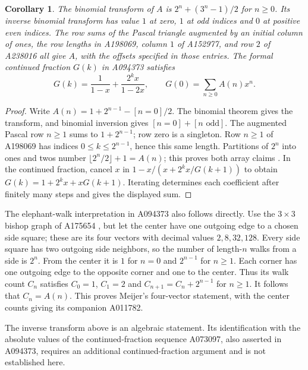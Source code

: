 \documentclass[11pt]{article}
\newtheorem{corollary}[theorem]{Corollary}
\begin{document}
\begin{corollary}\label{encodings}
The binomial transform of $A$ is $2^n+(3^n-1)/2$ for $n\ge0$.
Its inverse binomial transform has value $1$ at zero, $1$ at odd
indices and $0$ at positive even indices. The row sums of the
Pascal triangle augmented by an initial column of ones, the row
lengths in A198069, column $1$ of A152977, and row $2$ of A238016
all give $A$, with the offsets specified in those entries.
The formal continued fraction $G(k)$ in A094373 satisfies
\[
 G(k)=\frac{1}{1-x}+\frac{2^k x}{1-2x},\qquad G(0)=\sum_{n\ge0}A(n)x^n.
\]
\end{corollary}
\begin{proof}
Write $A(n)=1+2^{n-1}-[n=0]/2$. The binomial theorem gives the
transform, and binomial inversion gives $[n=0]+[n\text{ odd}]$.
The augmented Pascal row $n\ge1$ sums to $1+2^{n-1}$;
row zero is a singleton. Row $n\ge1$ of A198069 has indices
$0\le k\le2^{n-1}$, hence this same length. Partitions of $2^n$
into ones and twos number $\lfloor2^n/2\rfloor+1=A(n)$;
this proves both array claims \cite{oeisArrays}. In the continued
fraction, cancel $x$ in
$1-x/(x+2^kx/G(k+1))$ to obtain
$G(k)=1+2^kx+xG(k+1)$. Iterating determines each coefficient
after finitely many steps and gives the displayed sum.
\end{proof}

The elephant-walk interpretation in A094373 also follows directly.
Use the $3\times3$ bishop graph of A175654 \cite{oeisElephant},
but let the center have one outgoing edge to a chosen side square;
these are its four vectors with decimal values $2,8,32,128$.
Every side square has two outgoing side neighbors, so the number
of length-$n$ walks from a side is $2^n$. From the center it is
$1$ for $n=0$ and $2^{n-1}$ for $n\ge1$. Each corner has one
outgoing edge to the opposite corner and one to the center. Thus
its walk count $C_n$ satisfies $C_0=1$, $C_1=2$ and
$C_{n+1}=C_n+2^{n-1}$ for $n\ge1$. It follows that $C_n=A(n)$.
This proves Meijer's four-vector statement, with the center counts
giving its companion A011782.

The inverse transform above is an algebraic statement. Its identification
with the absolute values of the continued-fraction sequence A073097,
also asserted in A094373, requires an additional continued-fraction
argument and is not established here.
\end{document}

